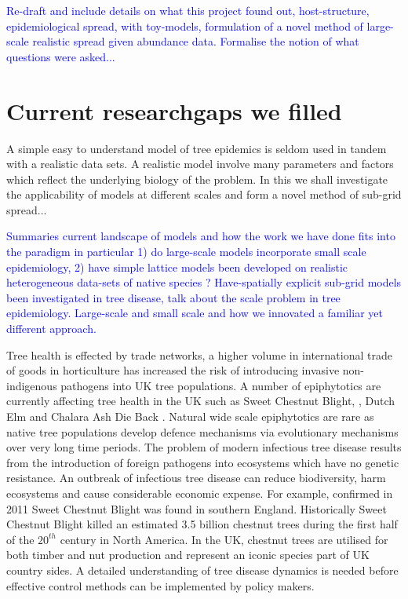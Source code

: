 \textcolor{blue}{Re-draft and include details on what this project found out, host-structure, epidemiological spread, with toy-models, formulation of a novel method of large-scale realistic spread given abundance data. Formalise the notion of what questions were asked...}

\section{Current research\textemdash gaps we filled}
A simple easy to understand model of tree epidemics is seldom used in tandem with a realistic data sets. A realistic model involve many parameters and factors which reflect the underlying biology of the problem. In this we shall investigate the applicability of models at different scales and form a novel method of sub-grid spread...

\textcolor{blue}{Summaries current landscape of models and how the work we have done fits into the paradigm in particular 1) do large-scale models incorporate small scale epidemiology, 2) have simple lattice models been developed on realistic heterogeneous data-sets of native species ? Have-spatially explicit sub-grid models been investigated in tree disease, talk about the scale problem in tree epidemiology. Large-scale and small scale and how we innovated a familiar yet different approach.}

Tree health is effected by trade networks, a higher volume in international trade of goods in horticulture has increased the risk of introducing invasive non-indigenous pathogens into UK tree populations. A number of epiphytotics are currently affecting tree health in the UK such as Sweet Chestnut Blight, \cite{MITCHELL201495, CB}, Dutch Elm \cite{DUTCH_ELM1,DUTCH_ELM2} and Chalara Ash Die Back \cite{ADB}. Natural wide scale epiphytotics are rare as native tree populations develop defence mechanisms via evolutionary mechanisms over very long time periods. The problem of modern infectious tree disease results from the introduction of foreign pathogens into ecosystems which have no genetic resistance. An outbreak of infectious tree disease can reduce biodiversity, harm ecosystems and cause considerable economic expense. For example, confirmed in 2011 Sweet Chestnut Blight was found in southern England. Historically Sweet Chestnut Blight killed an estimated 3.5 billion chestnut trees during the first half of the $20^{th}$ century in North America. In the UK, chestnut trees are utilised for both timber and nut production and represent an iconic species part of UK country sides. A detailed understanding of tree disease dynamics is needed before effective control methods can be implemented by policy makers.

